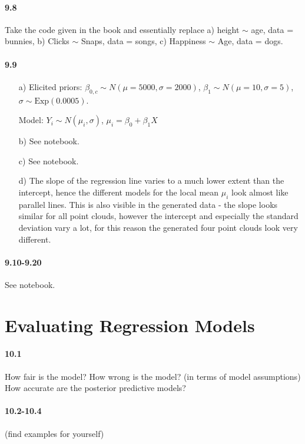 \documentclass[fontsize=11pt,DIV=18,parskip=half]{scrartcl}
\begin{document}
\paragraph{9.8} Take the code given in the book and essentially replace a) height $\sim$ age, data = bunnies, b) Clicks $\sim$ Snaps, data = songs, c) Happiness $\sim$ Age, data = dogs.

\paragraph{9.9} 
\begin{itemize}
\item[a)] Elicited priors: $\beta_{0,c} \sim N(\mu=5000, \sigma=2000)$, $\beta_1 \sim N(\mu=10, \sigma=5)$, $\sigma \sim \text{Exp}(0.0005)$.

Model: $Y_i \sim N(\mu_i, \sigma)$, $\mu_i = \beta_0 + \beta_1 X$
\item[b)] See notebook.
\item[c)] See notebook.
\item[d)] The slope of the regression line varies to a much lower extent than the intercept, hence the different models for the local mean $\mu_i$ look almost like parallel lines. This is also visible in the generated data - the slope looks similar for all point clouds, however the intercept and especially the standard deviation vary a lot, for this reason the generated four point clouds look very different.
\end{itemize}

\paragraph{9.10-9.20} See notebook.

\section{Evaluating Regression Models}

\paragraph{10.1} How fair is the model? How wrong is the model? (in terms of model assumptions) How accurate are the posterior predictive models?

\paragraph{10.2-10.4} (find examples for yourself)
\end{document}
